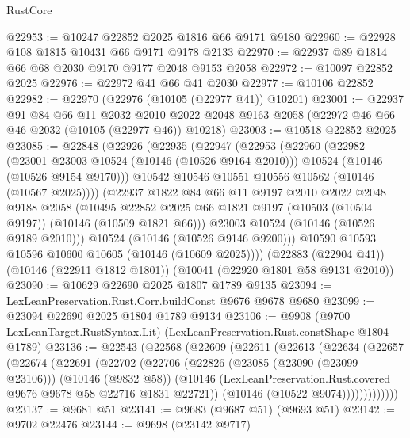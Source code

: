 \begin{lexlean}{RustCore}
\begin{coremodule}
@22953 := @10247 @22852 @2025 @1816 @66 @9171 @9180
@22960 := @22928 @108 @1815 @10431 @66 @9171 @9178 @2133
@22970 := @22937 @89 @1814 @66 @68 @2030 @9170 @9177 @2048 @9153 @2058
@22972 := @10097 @22852 @2025
@22976 := @22972 @41 @66 @41 @2030
@22977 := @10106 @22852
@22982 := @22970 (@22976 (@10105 (@22977 @41)) @10201)
@23001 := @22937
    @91
    @84
    @66
    @11
    @2032
    @2010
    @2022
    @2048
    @9163
    @2058
    (@22972 @46 @66 @46 @2032 (@10105 (@22977 @46)) @10218)
@23003 := @10518 @22852 @2025
@23085 := @22848
    (@22926
      (@22935
        (@22947
          (@22953
            (@22960
              (@22982
                (@23001 @23003 @10524 (@10146 (@10526 @9164 @2010)))
                @10524
                (@10146 (@10526 @9154 @9170)))
              @10542
              @10546
              @10551
              @10556
              @10562
              (@10146 (@10567 @2025))))
          (@22937
            @1822
            @84
            @66
            @11
            @9197
            @2010
            @2022
            @2048
            @9188
            @2058
            (@10495
              @22852
              @2025
              @66
              @1821
              @9197
              (@10503 (@10504 @9197))
              (@10146 (@10509 @1821 @66)))
            @23003
            @10524
            (@10146 (@10526 @9189 @2010)))
          @10524
          (@10146 (@10526 @9146 @9200)))
        @10590
        @10593
        @10596
        @10600
        @10605
        (@10146 (@10609 @2025))))
    (@22883 (@22904 @41))
    (@10146 (@22911 @1812 @1801))
    (@10041 (@22920 @1801 @58 @9131 @2010))
@23090 := @10629 @22690 @2025 @1807 @1789 @9135
@23094 := LexLeanPreservation.Rust.Corr.buildConst @9676 @9678 @9680
@23099 := @23094 @22690 @2025 @1804 @1789 @9134
@23106 := @9908
    (@9700 LexLeanTarget.RustSyntax.Lit)
    (LexLeanPreservation.Rust.constShape @1804 @1789)
@23136 := @22543
    (@22568
      (@22609
        (@22611
          (@22613
            (@22634
              (@22657
                (@22674
                  (@22691
                    (@22702
                      (@22706
                        (@22826
                          (@23085 (@23090 (@23099 @23106)))
                          (@10146 (@9832 @58))
                          (@10146
                            (LexLeanPreservation.Rust.covered @9676 @9678 @58 @22716 @1831 @22721))
                          (@10146 (@10522 @9074)))))))))))))
@23137 := @9681 @51
@23141 := @9683 (@9687 @51) (@9693 @51)
@23142 := @9702 @22476
@23144 := @9698 (@23142 @9717)

\end{coremodule}
\end{lexlean}
